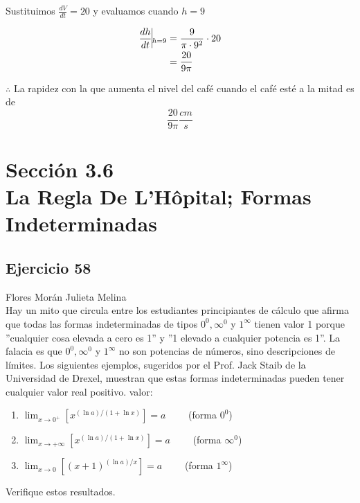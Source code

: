 \documentclass[12pt]{article}
\begin{document}
Sustituimos $\frac{dV}{dt}=20$ y evaluamos cuando $h=9$

\begin{align*}
  \frac{dh}{dt}\vline_{h=9}
  &= \frac{9}{\pi \cdot 9^2}\cdot 20\\
  &= \frac{20}{9\pi}
\end{align*}

$\therefore $ La rapidez con la que aumenta  el nivel del café cuando el café esté a la mitad es de
\[
\frac{20}{9\pi}\frac{cm}{s}
\]

\section{Sección 3.6 \\ La Regla De L'Hôpital; Formas Indeterminadas} 
\subsection{Ejercicio 58} Flores Morán Julieta Melina \\

Hay un mito que circula entre los estudiantes principiantes de cálculo que afirma que todas las formas indeterminadas de tipos $0^0,\infty^0$ y $1^{\infty}$ tienen valor 1 porque ''cualquier cosa elevada a cero es 1'' y ''1 elevado a cualquier potencia es 1''. La falacia es que $0^0,\infty^0$ y $1^{\infty}$ no son potencias de números, sino descripciones de límites. Los siguientes ejemplos, sugeridos por el Prof. Jack Staib de la Universidad de Drexel, muestran que estas formas indeterminadas pueden tener cualquier valor real positivo.
valor:
\begin{enumerate}[label=(\alph*)]
\item $\lim_{x \to 0^+} [x^{(\ln a)/(1+\ln x)}]=a \qquad$ (forma $0^0$)
\item $\lim_{x \to +\infty} [x^{(\ln a)/(1+\ln x)}]=a \qquad$ (forma $\infty^0$)
\item $\lim_{x \to 0} [(x+1)^{(\ln a)/x}]=a \qquad$ (forma $1^{\infty}$)
\end{enumerate}
Verifique estos resultados.
\end{document}
